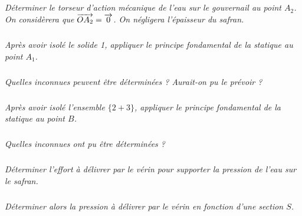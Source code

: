 \documentclass[10pt]{article}
\begin{document}
\vspace{.5cm}

\subparagraph{}
\textit{Déterminer le torseur d'action mécanique de l'eau sur le gouvernail au point $A_2$. On considèrera que $\overrightarrow{OA_2}=\overrightarrow{0}$. On négligera l'épaisseur du safran.} 

\subparagraph{}
\textit{Après avoir isolé le solide 1, appliquer le principe fondamental de la statique au point $A_1$.}

\subparagraph{}
\textit{Quelles inconnues peuvent être déterminées ? Aurait-on pu le prévoir ?}

\subparagraph{}
\textit{Après avoir isolé l'ensemble $\{2+3\}$, appliquer le principe fondamental de la statique au point $B$.}


\subparagraph{}
\textit{Quelles inconnues ont pu être déterminées ?}


\subparagraph{}
\textit{Déterminer l'effort à délivrer par le vérin pour supporter la pression de l'eau sur le safran.}

\subparagraph{}
\textit{Déterminer alors la pression à délivrer par le vérin en fonction d'une section $S$.}
\end{document}

